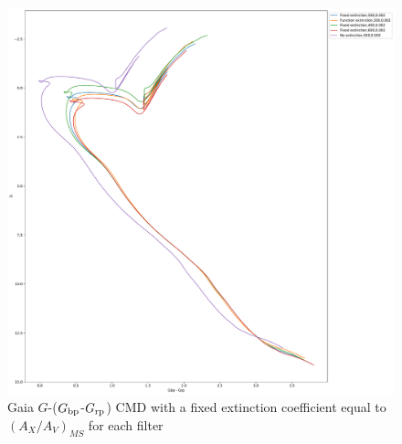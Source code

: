 \documentclass[12pt, a4paper]{report}
\begin{document}
\begin{figure}[h]
\begin{center}
\includegraphics[scale=0.25]{../basti_isochrones_10_13Gyr/Extinction_T5k_FeH0fix_func_G_GbpmGrp_500_400_600_Myr_FeH_0p002_ref_noext_Av_1p0.pdf}
\caption{Gaia $G$-($G_{\textnormal{bp}}$-$G_{\textnormal{rp}}$) CMD with a fixed extinction coefficient equal to $(A_{X}/A_{V})_{MS}$ for each filter}
\label{gaia_isoc_T5k}


\end{center}
\end{figure}
\end{document}

